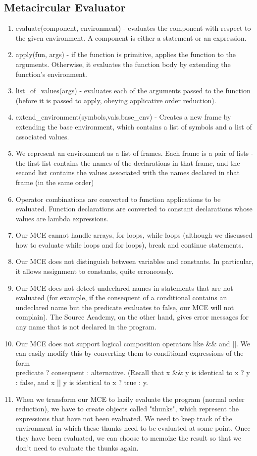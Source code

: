 \documentclass[11pt]{article}
\theoremstyle{definition}
\begin{document}
\subsection{Metacircular Evaluator}
\begin{enumerate}
    \item {\code evaluate(component, environment)} - evaluates the component with respect to the given environment. A component is either a statement or an expression.
    \item {\code apply(fun, args)} - if the function is primitive, applies the function to the arguments. Otherwise, it evaluates the function body by extending the function's environment.
    \item {\code list\_of\_values(args)} - evaluates each of the arguments passed to the function (before it is passed to apply, obeying applicative order reduction). 
    \item {\code extend\_environment(symbols,vals,base\_env)} - Creates a new frame by extending the base environment, which contains a list of symbols and a list of associated values.
    \item We represent an environment as a list of frames. Each frame is a pair of lists - the first list contains the names of the declarations in that frame, and the second list contains the values associated with the names declared in that frame (in the same order)
    \item Operator combinations are converted to function applications to be evaluated. Function declarations are converted to constant declarations whose values are lambda expressions.
    \item Our MCE cannot handle arrays, for loops, while loops (although we discussed how to evaluate while loops and for loops), break and continue statements.
    \item Our MCE does not distinguish between variables and constants. In particular, it allows assignment to constants, quite erroneously.
    \item Our MCE does not detect undeclared names in statements that are not evaluated (for example, if the consequent of a conditional contains an undeclared name but the predicate evaluates to false, our MCE will not complain). The Source Academy, on the other hand, gives error messages for any name that is not declared in the program.
    \item Our MCE does not support logical composition operators like {\code \&\&} and {\code ||}. We can easily modify this by converting them to conditional expressions of the form \\ {\code predicate ? consequent : alternative}. (Recall that {\code x \&\& y} is identical to {\code x ? y : false}, and {\code x || y} is identical to {\code x ? true : y}.
    \item When we transform our MCE to lazily evaluate the program (normal order reduction), we have to create objects called "thunks", which represent the expressions that have not been evaluated. We need to keep track of the environment in which these thunks need to be evaluated at some point. Once they have been evaluated, we can choose to memoize the result so that we don't need to evaluate the thunks again.
    

\end{enumerate}
\end{document}
